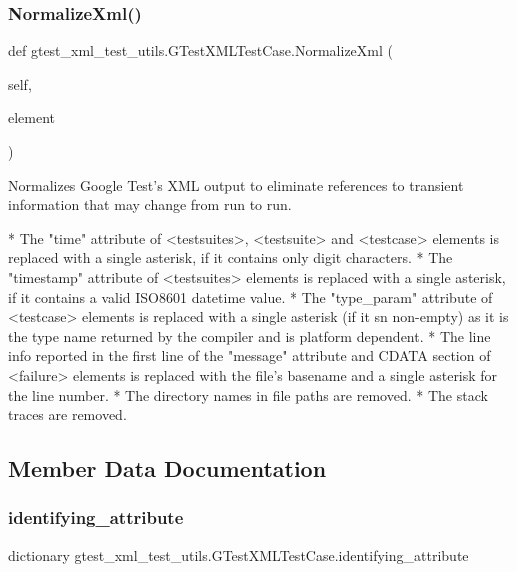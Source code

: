 \subsubsection{\texorpdfstring{Normalize\+Xml()}{NormalizeXml()}}
{\footnotesize\ttfamily def gtest\+\_\+xml\+\_\+test\+\_\+utils.\+G\+Test\+X\+M\+L\+Test\+Case.\+Normalize\+Xml (\begin{DoxyParamCaption}\item[{}]{self,  }\item[{}]{element }\end{DoxyParamCaption})}

\begin{DoxyVerb}Normalizes Google Test's XML output to eliminate references to transient
information that may change from run to run.

*  The "time" attribute of <testsuites>, <testsuite> and <testcase>
   elements is replaced with a single asterisk, if it contains
   only digit characters.
*  The "timestamp" attribute of <testsuites> elements is replaced with a
   single asterisk, if it contains a valid ISO8601 datetime value.
*  The "type_param" attribute of <testcase> elements is replaced with a
   single asterisk (if it sn non-empty) as it is the type name returned
   by the compiler and is platform dependent.
*  The line info reported in the first line of the "message"
   attribute and CDATA section of <failure> elements is replaced with the
   file's basename and a single asterisk for the line number.
*  The directory names in file paths are removed.
*  The stack traces are removed.
\end{DoxyVerb}
 

\subsection{Member Data Documentation}
\mbox{\label{classgtest__xml__test__utils_1_1_g_test_x_m_l_test_case_a0e3a4e84e18f29d2248dcd670a0a6ae6}} 
\subsubsection{\texorpdfstring{identifying\+\_\+attribute}{identifying\_attribute}}
{\footnotesize\ttfamily dictionary gtest\+\_\+xml\+\_\+test\+\_\+utils.\+G\+Test\+X\+M\+L\+Test\+Case.\+identifying\+\_\+attribute\hspace{0.3cm}{\ttfamily [static]}}

